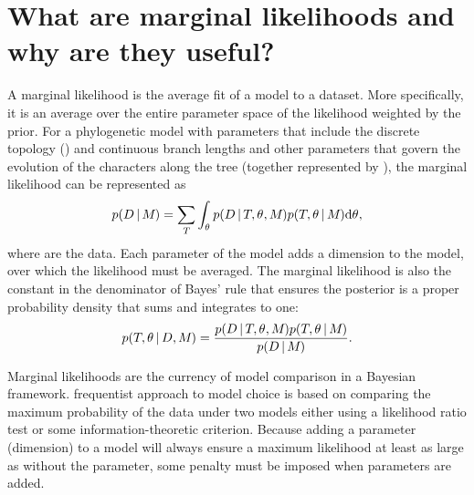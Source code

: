 \section{What are marginal likelihoods and why are they useful?}

\begin{linenomath}
A marginal likelihood is the average fit of a model to a dataset.
More specifically, it is an average over the entire parameter space of the
likelihood weighted by the prior.
For a phylogenetic model \model with parameters that include the discrete
topology (\topology) and continuous branch lengths and other parameters that
govern the evolution of the characters along the tree (together represented by
\evoparameters), the marginal likelihood can be represented as
\begin{equation}
    p(D \,|\, M_{}) =
    \sum\limits_{T_{}}
    \int_{\theta_{}}
    p( D \,|\, T_{}, \theta_{}, M_{})
    p(T_{}, \theta_{} \,|\, M_{})
    \mathrm{d}\theta_{},
    \label{eq:marginalLikelihood}
\end{equation}
where \data are the data.
Each parameter of the model adds a dimension to the model, over which the
likelihood must be averaged.
The marginal likelihood is also the 
constant in the denominator of Bayes' rule that ensures the posterior is a
proper probability density that sums and integrates to one:
\begin{equation}
    p(T_{}, \theta_{} \,|\, D, M_{}) = \frac{
        p(D \,|\, T_{}, \theta_{}, M_{})
        p(T_{}, \theta_{} \,|\, M_{})
    }{
        p(D \,|\, M_{})
    }.
    \label{eq:bayesRule}
\end{equation}
\end{linenomath}


Marginal likelihoods are the currency of model comparison in a Bayesian
framework.
 frequentist approach to model
choice is based on comparing the maximum probability of the
data under two models either using a likelihood ratio test or some
information-theoretic criterion.
Because adding a parameter (dimension) to a model will always ensure
a maximum likelihood at least as large as without the parameter, some
penalty must be imposed when parameters are added.

